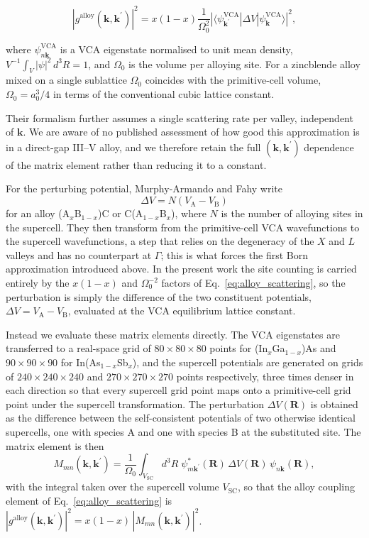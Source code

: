 \documentclass[aps,prmaterials,reprint,amsmath,amssymb,superscriptaddress]{revtex4-2}
\begin{document}
\begin{equation}
    |g^\text{alloy}(\bm{k},\bm{k}^\prime)|^2 = x(1-x) \frac{1}{\Omega_0^2} | \langle \psi^\text{VCA}_{\bm{k}^\prime} | \Delta V | \psi^\text{VCA}_{\bm{k}} \rangle|^2,\label{eq:alloy_scattering}
\end{equation}

where $\psi^\text{VCA}_{n\bm{k}}$ is a VCA eigenstate normalised to unit mean density, $V^{-1}\!\int_V|\psi|^2\,d^3R = 1$, and $\Omega_0$ is the volume per alloying site. For a zincblende alloy mixed on a single sublattice $\Omega_0$ coincides with the primitive-cell volume, $\Omega_0 = a_0^3/4$ in terms of the conventional cubic lattice constant.

Their formalism further assumes a single scattering rate per valley, independent of $\bm{k}$. We are aware of no published assessment of how good this approximation is in a direct-gap III--V alloy, and we therefore retain the full $(\bm{k},\bm{k}^\prime)$ dependence of the matrix element rather than reducing it to a constant.

For the perturbing potential, Murphy-Armando and Fahy write
\begin{equation}
    \Delta V = N (V_\text{A}-V_\text{B})
    \label{eq:deltaV_MA}
\end{equation}
for an alloy (A$_x$B$_{1-x}$)C or C(A$_{1-x}$B$_x$), where $N$ is the number of alloying sites in the supercell\cite{MurphyArmando2008}. They then transform from the primitive-cell VCA wavefunctions to the supercell wavefunctions, a step that relies on the degeneracy of the $X$ and $L$ valleys and has no counterpart at $\Gamma$; this is what forces the first Born approximation introduced above. In the present work the site counting is carried entirely by the $x(1-x)$ and $\Omega_0^{-2}$ factors of Eq.~\eqref{eq:alloy_scattering}, so the perturbation is simply the difference of the two constituent potentials, $\Delta V = V_\text{A}-V_\text{B}$, evaluated at the VCA equilibrium lattice constant.

Instead we evaluate these matrix elements directly. The VCA eigenstates are transferred to a real-space grid of $80\times 80\times 80$ points for (In$_x$Ga$_{1-x}$)As and $90\times 90\times 90$ for In(As$_{1-x}$Sb$_x$), and the supercell potentials are generated on grids of $240\times 240\times 240$ and $270\times 270\times 270$ points respectively, three times denser in each direction so that every supercell grid point maps onto a primitive-cell grid point under the supercell transformation. The perturbation $\Delta V(\bm{R})$ is obtained as the difference between the self-consistent potentials of two otherwise identical supercells, one with species A and one with species B at the substituted site. The matrix element is then
\begin{equation}
    M_{mn}(\bm{k},\bm{k}^\prime)= \frac{1}{\Omega_0}
    \int_{V_\text{SC}} d^3R\; \psi^{*}_{m\bm{k}^\prime}(\bm{R})\,
    \Delta V(\bm{R})\,\psi_{n\bm{k}}(\bm{R}),
    \label{eq:matrix_element}
\end{equation}
with the integral taken over the supercell volume $V_\text{SC}$, so that the alloy coupling element of Eq.~\eqref{eq:alloy_scattering} is $|g^\text{alloy}(\bm{k},\bm{k}^\prime)|^2 = x(1-x)\,|M_{mn}(\bm{k},\bm{k}^\prime)|^2$.
\end{document}
